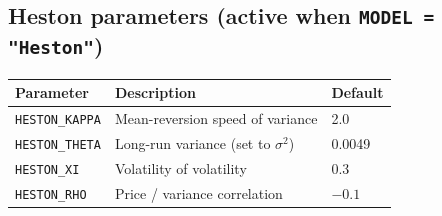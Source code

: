 \documentclass[12pt,a4paper]{article}
\begin{document}
\subsection*{Heston parameters (active when \texttt{MODEL = "Heston"})}

\begin{center}
\begin{tabular}{lll}
\toprule
\textbf{Parameter} & \textbf{Description} & \textbf{Default} \\
\midrule
\texttt{HESTON\_KAPPA} & Mean-reversion speed of variance          & 2.0 \\
\texttt{HESTON\_THETA} & Long-run variance (set to $\sigma^2$)     & 0.0049 \\
\texttt{HESTON\_XI}    & Volatility of volatility                  & 0.3 \\
\texttt{HESTON\_RHO}   & Price / variance correlation              & $-0.1$ \\
\bottomrule
\end{tabular}
\end{center}
\end{document}
